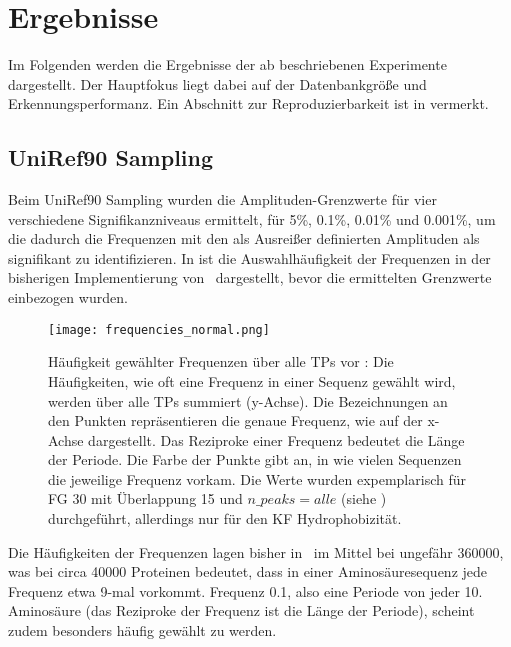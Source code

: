 \section{Ergebnisse} %
    \label{sec:ergebnisse}
    Im Folgenden werden die Ergebnisse der \NumWord{\theexperiment} ab  beschriebenen Experimente dargestellt. Der Hauptfokus liegt dabei auf der Datenbankgröße und Erkennungsperformanz. Ein Abschnitt zur Reproduzierbarkeit ist in  vermerkt.

    \subsection{UniRef90 Sampling} %
        \label{sub:uniref90_results}

        Beim UniRef90 Sampling wurden die Amplituden-Grenzwerte für vier verschiedene Signifikanzniveaus ermittelt, für 5\%, 0.1\%, 0.01\% und 0.001\%, um die dadurch die Frequenzen mit den als Ausreißer definierten Amplituden als signifikant zu identifizieren. In  ist die Auswahlhäufigkeit der Frequenzen in der bisherigen Implementierung von \protfin\ dargestellt, bevor die ermittelten Grenzwerte einbezogen wurden.

        \begin{figure}[H]
            \texttt{[image: frequencies\_normal.png]}
            \caption[Häufigkeit gewählter Frequenzen über alle \aclp{TP} vor ]{Häufigkeit gewählter Frequenzen über alle \acp{TP} vor : Die Häufigkeiten, wie oft eine Frequenz in einer Sequenz gewählt wird, werden über alle \acp{TP} summiert (y-Achse). Die Bezeichnungen an den Punkten repräsentieren die genaue Frequenz, wie auf der x-Achse dargestellt. Das Reziproke einer Frequenz bedeutet die Länge der Periode. Die Farbe der Punkte gibt an, in wie vielen Sequenzen die jeweilige Frequenz vorkam. Die Werte wurden expemplarisch für \acl{FG} 30 mit Überlappung 15 und $n\_peaks=alle$ (siehe ) durchgeführt, allerdings nur für den \ac{KF} Hydrophobizität.}
            \label{fig:frequencies_normal}
        \end{figure}

        Die Häufigkeiten der Frequenzen lagen bisher in \protfin\ im Mittel bei ungefähr 360000, was bei circa 40000 Proteinen bedeutet, dass in einer Aminosäuresequenz jede Frequenz etwa 9-mal vorkommt. Frequenz 0.1, also eine Periode von jeder 10. Aminosäure (das Reziproke der Frequenz ist die Länge der Periode), scheint zudem besonders häufig gewählt zu werden.

